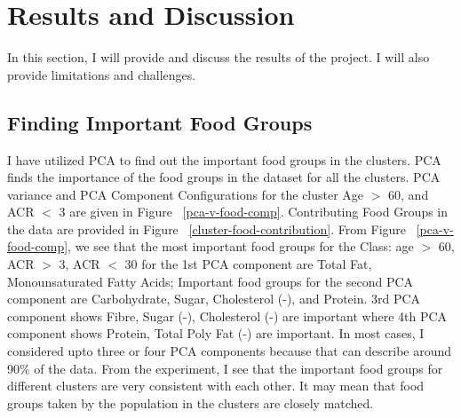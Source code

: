 \section {Results and Discussion}
In this section, I will provide and discuss the results of the project. I will also provide limitations and challenges.

\subsection{Finding Important Food Groups}
\flushleft \justifying I have utilized PCA to find out the important food groups in the clusters. PCA finds the importance of the food groups in the dataset for all the clusters. PCA variance and PCA Component Configurations for the cluster Age $>$ 60, and ACR $<$ 3 are given in Figure ~\ref{pca-v-food-comp}. Contributing Food Groups in the data are provided in Figure ~\ref{cluster-food-contribution}. From Figure ~\ref{pca-v-food-comp}, we see that the most important food groups for the Class: age $>$ 60, ACR $>$ 3, ACR $<$ 30 for the 1st PCA component are Total Fat, Monounsaturated Fatty Acids; Important food groups for the second PCA component are Carbohydrate, Sugar, Cholesterol (-), and Protein. 3rd PCA component shows Fibre, Sugar (-), Cholesterol (-) are important where 4th PCA component shows Protein, Total Poly Fat (-) are important. In most cases, I considered upto three or four PCA components because that can describe around 90\% of the data. From the experiment, I see that the important food groups for different clusters are very consistent with each other. It may mean that food groups taken by the population in the clusters are closely matched.


